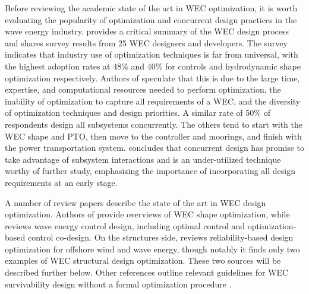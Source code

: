 Before reviewing the academic state of the art in WEC optimization, it is worth evaluating the popularity of optimization and concurrent design practices in the wave energy industry. \cite{trueworthy_wave_2020} provides a critical summary of the WEC design process and shares survey results from 25 WEC designers and developers. The survey indicates that industry use of optimization techniques is far from universal, with the highest adoption rates at 48\% and 40\% for controls and hydrodynamic shape optimization respectively. Authors of \cite{trueworthy_wave_2020} speculate that this is due to the large time, expertise, and computational resources needed to perform optimization, the inability of optimization to capture all requirements of a WEC, and the diversity of optimization techniques and design priorities. A similar rate of 50\% of respondents design all subsystems concurrently. The others tend to start with the WEC shape and PTO, then move to the controller and moorings, and finish with the power transportation system. \cite{trueworthy_wave_2020} concludes that concurrent design has promise to take advantage of subsystem interactions and is an under-utilized technique worthy of further study, emphasizing the importance of incorporating all design requirements at an early stage.

A number of review papers describe the state of the art in WEC design optimization. Authors of \cite{garcia-teruel_review_2021,guo_geometric_2021} provide overviews of WEC shape optimization, while \cite{ringwood_empowering_2023} reviews wave energy control design, including optimal control and optimization-based control co-design. On the structures side, \cite{clark_reliability-based_2018} reviews reliability-based design optimization for offshore wind and wave energy, though notably it finds only two examples of WEC structural design optimization. These two sources \cite{ambuhl_reliability-based_2014, ferri_balancing_2014} will be described further below. Other references outline relevant guidelines for WEC survivability design without a formal optimization procedure \cite{coe_survey_2018, ove_arup__partners_ltd_structural_2016,paduano_towards_2024,giannini_wave_2022}.

